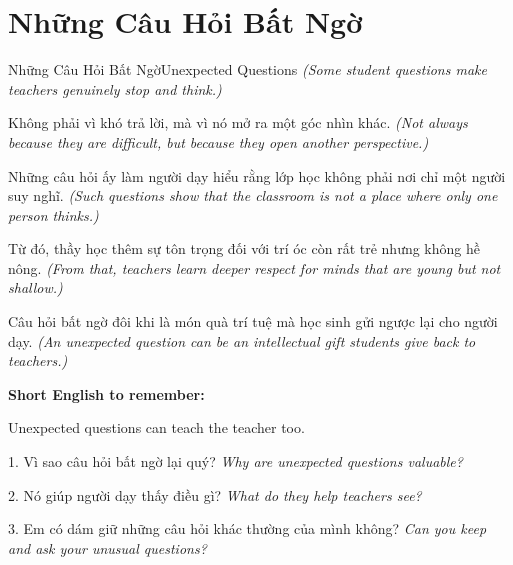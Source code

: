 \section{Những Câu Hỏi Bất Ngờ}
\begin{truyen}{Những Câu Hỏi Bất Ngờ}{Unexpected Questions}
\textit{(Some student questions make teachers genuinely stop and think.)}

Không phải vì khó trả lời, mà vì nó mở ra một góc nhìn khác.
\textit{(Not always because they are difficult, but because they open another perspective.)}

Những câu hỏi ấy làm người dạy hiểu rằng lớp học không phải nơi chỉ một người suy nghĩ.
\textit{(Such questions show that the classroom is not a place where only one person thinks.)}

Từ đó, thầy học thêm sự tôn trọng đối với trí óc còn rất trẻ nhưng không hề nông.
\textit{(From that, teachers learn deeper respect for minds that are young but not shallow.)}
\end{truyen}

\begin{baihoc}
Câu hỏi bất ngờ đôi khi là món quà trí tuệ mà học sinh gửi ngược lại cho người dạy.
\textit{(An unexpected question can be an intellectual gift students give back to teachers.)}
\end{baihoc}

\begin{ghinhoanh}
\textbf{Short English to remember:}

Unexpected questions can teach the teacher too.

\end{ghinhoanh}

\begin{tuhocnhanh}
1. Vì sao câu hỏi bất ngờ lại quý? \textit{Why are unexpected questions valuable?}

2. Nó giúp người dạy thấy điều gì? \textit{What do they help teachers see?}

3. Em có dám giữ những câu hỏi khác thường của mình không? \textit{Can you keep and ask your unusual questions?}
\end{tuhocnhanh}
\ngancach

